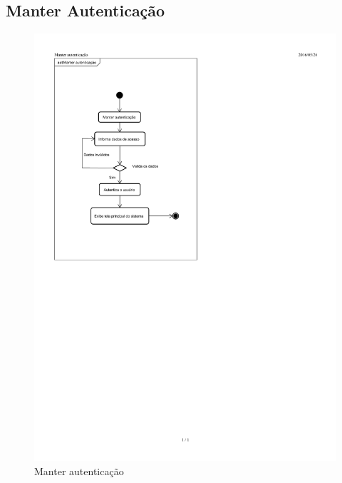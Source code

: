\documentclass[chapter=TITLE,12pt,oneside,a4paper,english,french,sumario=tradicional,spanish,brazil,]{abntex2}
\begin{document}
\subsection{Manter Autenticação}
\begin{figure}[h]\centering
	\includegraphics[scale=1.6]{autenticacao.pdf}\caption{Manter autenticação}
\end{figure}

\newpage
\end{document}
